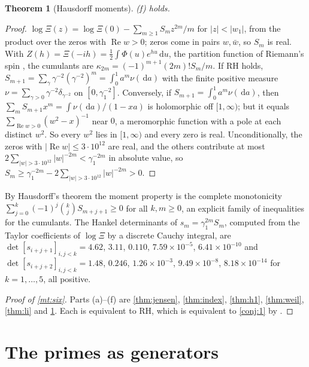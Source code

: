 \documentclass[11pt]{article}
\newtheorem{theorem}{Theorem}[section]
\theoremstyle{definition}\newtheorem{definition}[theorem]{Definition}
\theoremstyle{remark}\newtheorem{remark}[theorem]{Remark}
\newcommand{\dd}{\,\mathrm d}\newcommand{\e}{\mathrm e}
\renewcommand{\Re}{\operatorname{Re}}\renewcommand{\Im}{\operatorname{Im}}
\begin{document}
\begin{theorem}[Hausdorff moments]\label{thm:hausdorff}
(f) holds.
\end{theorem}
\begin{proof}
$\log\Xi(z)=\log\Xi(0)-\sum_{m\ge1}S_mz^{2m}/m$ for $|z|<|w_1|$, from the product over the zeros with $\Re w>0$; zeros come in pairs $w,\bar w$, so $S_m$ is real. With $Z(h)=\Xi(-ih)=\frac12\int\Phi(u)e^{hu}\dd u$, the partition function of Riemann's spin \cite{Newman76,S01}, the cumulants are $\kappa_{2m}=(-1)^{m+1}(2m)!S_m/m$. If RH holds, $S_{m+1}=\sum_\gamma\gamma^{-2}(\gamma^{-2})^m=\int_0^1a^m\nu(\dd a)$ with the finite positive measure $\nu=\sum_{\gamma>0}\gamma^{-2}\delta_{\gamma^{-2}}$ on $[0,\gamma_1^{-2}]$. Conversely, if $S_{m+1}=\int_0^1a^m\nu(\dd a)$, then $\sum_mS_{m+1}x^m=\int\nu(\dd a)/(1-xa)$ is holomorphic off $[1,\infty)$; but it equals $\sum_{\Re w>0}(w^2-x)^{-1}$ near $0$, a meromorphic function with a pole at each distinct $w^2$. So every $w^2$ lies in $[1,\infty)$ and every zero is real. Unconditionally, the zeros with $|\Re w|\le3\cdot10^{12}$ are real, and the others contribute at most $2\sum_{|w|>3\cdot10^{12}}|w|^{-2m}<\gamma_1^{-2m}$ in absolute value, so $S_m\ge\gamma_1^{-2m}-2\sum_{|w|>3\cdot10^{12}}|w|^{-2m}>0$.
\end{proof}

By Hausdorff's theorem \cite{Hausdorff} the moment property is the complete monotonicity $\sum_{j=0}^k(-1)^j\binom kjS_{m+j+1}\ge0$ for all $k,m\ge0$, an explicit family of inequalities for the cumulants. The Hankel determinants of $s_m=\gamma_1^{2m}S_m$, computed from the Taylor coefficients of $\log\Xi$ by a discrete Cauchy integral, are $\det[s_{i+j+1}]_{i,j<k}=4.62$, $3.11$, $0.110$, $7.59\times10^{-5}$, $6.41\times10^{-10}$ and $\det[s_{i+j+2}]_{i,j<k}=1.48$, $0.246$, $1.26\times10^{-3}$, $9.49\times10^{-8}$, $8.18\times10^{-14}$ for $k=1,\dots,5$, all positive.

\begin{proof}[Proof of \cref{mt:six}]
Parts (a)--(f) are \cref{thm:jensen}, \cref{thm:index}, \cref{thm:h1}, \cref{thm:weil}, \cref{thm:li} and \cref{thm:hausdorff}. Each is equivalent to RH, which is equivalent to \cref{conj:1} by \cite{S01}.
\end{proof}

\section{The primes as generators}\label{sec:primes}
\end{document}
